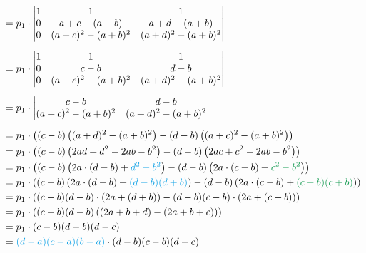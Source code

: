 \documentclass[main.tex]{subfiles}
\begin{document}
\begin{align*}
    &= p_1 \cdot 
        \begin{vmatrix}
            1 &               1 & 1 \\
            0 &       a+c-(a+b) & a+d-(a+b) \\
            0 & (a+c)^2-(a+b)^2 & (a+d)^2-(a+b)^2 \\
        \end{vmatrix} \\[2mm]
    &= p_1 \cdot 
        \begin{vmatrix}
            1 &               1 & 1 \\
            0 &             c-b & d-b \\
            0 & (a+c)^2-(a+b)^2 & (a+d)^2-(a+b)^2 \\
        \end{vmatrix} \\[2mm]
    &= p_1 \cdot 
        \begin{vmatrix}
                        c-b & d-b \\
            (a+c)^2-(a+b)^2 & (a+d)^2-(a+b)^2 \\
        \end{vmatrix} \\[2mm]
    &= p_1 \cdot 
    \left( (c-b)\left((a+d)^2-(a+b)^2\right) - (d-b)\left((a+c)^2-(a+b)^2\right) \right)\\
    &= p_1 \cdot 
    \left( (c-b)\left(
        2ad +d^2  -2ab -b^2
    \right) - (d-b)\left(
        2ac +c^2  -2ab -b^2
    \right) \right)\\
    &= p_1 \cdot 
    \left( (c-b)\left(
        2a\cdot (d-b) + \textcolor{Cerulean}{d^2 - b^2}
    \right) - (d-b)\left(
        2a \cdot(c-b) + \textcolor{ForestGreen}{c^2 - b^2}
    \right) \right)\\
    &= %
    p_1 \cdot 
    \left( (c-b)\left(
        2a\cdot (d-b) + \textcolor{Cerulean}{(d-b)(d+b)}
    \right) - (d-b)\left(
        2a \cdot(c-b) + \textcolor{ForestGreen}{(c-b)(c+b)}
    \right) \right)\\
    &= %
    p_1 \cdot 
    \left( (c-b)
        (d-b) \cdot (2a + (d+b))
    - (d-b)
        (c-b) \cdot (2a + (c+b))
    \right)\\
    &= %
    p_1 \cdot 
    \left( (c-b)(d-b) \left(
         (2a+b+d) - (2a+b+c)
    \right) \right)\\
    &= %
    p_1 \cdot (c-b)(d-b)(d - c) \\
    &= \textcolor{Cerulean}{(d-a)(c-a)(b-a)} \cdot (d-b)(c-b)(d-c)
\end{align*}
\end{document}

